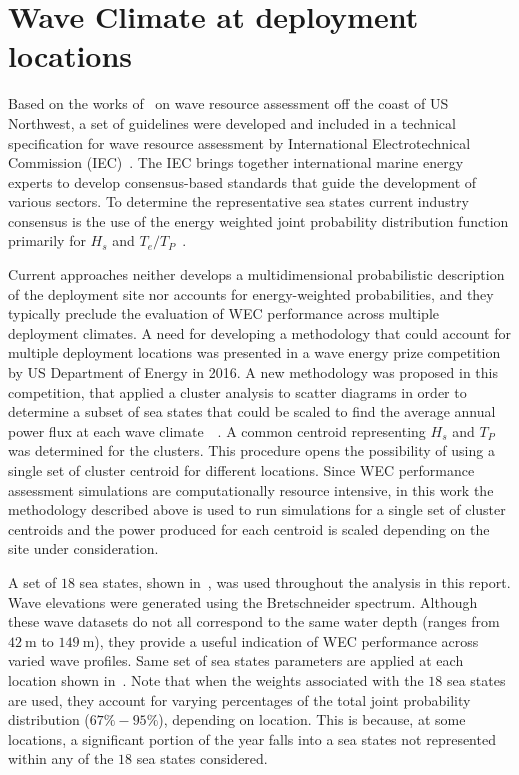 \documentclass[10pt,journal,a4paper,twoside]{./IMEJ}
\begin{document}
\section{Wave Climate at deployment locations}
\label{sec:deployment_sites}
Based on the works of~\cite{alday2024effects} on wave resource assessment off the coast of US Northwest, a set of guidelines were developed and included in a technical specification for wave resource assessment by International Electrotechnical Commission (IEC)~\cite{iec62600_101_2024}. The IEC brings together international marine energy experts to develop consensus-based standards that guide the development of various sectors. To determine the  representative sea states current industry consensus is the use of the energy weighted joint probability distribution function primarily for \(H_{s}\) and \(T_{e}/T_{P}\)~\cite{robertson2021holistic}.
\par
Current approaches neither develops a multidimensional probabilistic description of the deployment site nor accounts for energy-weighted probabilities, and they typically preclude the evaluation of WEC performance across multiple deployment climates. A need for developing a methodology that could account for multiple deployment locations was presented in a wave energy prize competition by US Department of Energy in 2016. A new methodology was proposed in this competition, that applied a cluster analysis to scatter diagrams in order to determine a subset of sea states that could be scaled to find the average annual power flux at each wave climate~\cite{bull2017wave}~. A common centroid representing \(H_{s}\) and \(T_{P}\) was determined for the clusters. This procedure opens the possibility of using a single set of cluster centroid for different locations. Since WEC performance assessment simulations are computationally resource intensive, in this work the methodology described above is used to run simulations for a single set of cluster centroids and the power produced for each centroid is scaled depending on the site under consideration.
\par
A set of \(18\) sea states, shown in~, was used throughout the analysis in this report. Wave elevations were generated using the Bretschneider spectrum. Although these wave datasets do not all correspond to the same water depth (ranges from \(42~\mathrm{m}\) to \(149~\mathrm{m}\)), they provide a useful indication of WEC performance across varied wave profiles. Same set of sea states parameters are applied at each location shown in~. Note that when the weights associated with the $18$ sea states are used, they account for varying percentages of the total joint probability distribution (\(67\%-95\%\)), depending on location. This is because, at some locations, a significant portion of the year falls into a sea states not represented within any of the \(18\) sea states considered.
\end{document}
